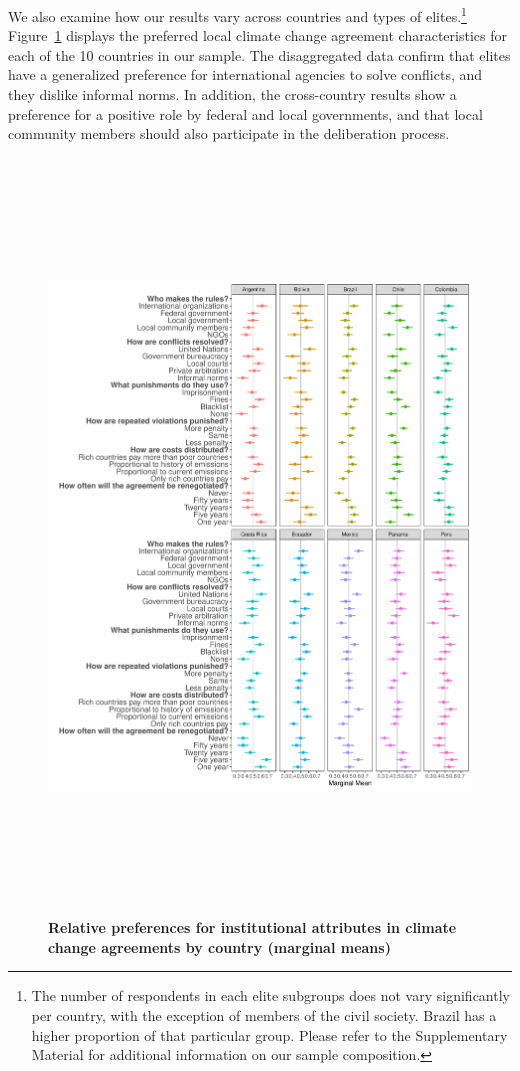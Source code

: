 \documentclass[a4paper,12pt]{article}
\begin{document}
We also examine how our results vary across countries and types of elites.\footnote{The number of respondents in each elite subgroups does not vary significantly per country, with the exception of members of the civil society. Brazil has a higher proportion of that particular group. Please refer to the Supplementary Material for additional information on our sample composition.} Figure~\ref{fig:countries} displays the preferred local climate change agreement characteristics for each of the 10 countries in our sample. The disaggregated data confirm that elites have a generalized preference for international agencies to solve conflicts, and they dislike informal norms. In addition, the cross-country results show a preference for a positive role by federal and local governments, and that local community members should also participate in the deliberation process.

\begin{figure}[hbpt]
	\centering
	\includegraphics[width=\linewidth, height=20cm]{MM_country.pdf}
	\caption{\textbf{Relative preferences for institutional attributes in climate change agreements by country (marginal means)}}
	\label{fig:countries}
\end{figure}
\end{document}
